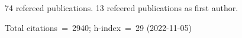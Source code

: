 74 refereed publications. 13 refeered publications as first author.

Total citations~=~2940; h-index~=~29 (2022-11-05)
